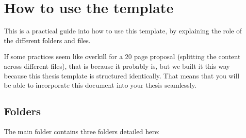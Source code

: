 \chapter{How to use the template} \label{ch-2}

This is a practical guide into how to use this template, by explaining the role of the different folders and files.

If some practices seem like overkill for a 20 page proposal (splitting the content across different files), that is because it probably is, but we built it this way because this thesis template is structured identically. That means that you will be able to incorporate this document into your thesis seamlessly.

\section{Folders}

The main folder contains three folders detailed here:


